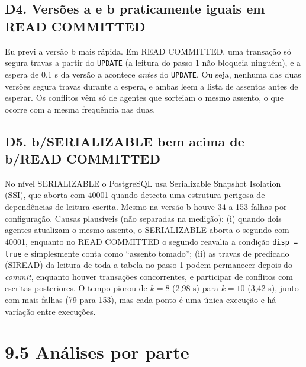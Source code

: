 \documentclass[11pt,a4paper]{article}
\newcommand{\tp}[1]{\texttt{#1}}
\begin{document}
\subsection*{D4. Versões a e b praticamente iguais em READ COMMITTED}
Eu previ a versão b mais rápida. Em READ COMMITTED, uma transação só segura travas a partir do \tp{UPDATE} (a leitura do passo 1 não bloqueia ninguém), e a espera de 0,1 s da versão a acontece \emph{antes} do \tp{UPDATE}. Ou seja, nenhuma das duas versões segura travas durante a espera, e ambas leem a lista de assentos antes de esperar. Os conflitos vêm só de agentes que sorteiam o mesmo assento, o que ocorre com a mesma frequência nas duas.

\subsection*{D5. b/SERIALIZABLE bem acima de b/READ COMMITTED}
No nível SERIALIZABLE o PostgreSQL usa Serializable Snapshot Isolation (SSI), que aborta com 40001 quando detecta uma estrutura perigosa de dependências de leitura-escrita. Mesmo na versão b houve 34 a 153 falhas por configuração. Causas plausíveis (não separadas na medição): (i) quando dois agentes atualizam o mesmo assento, o SERIALIZABLE aborta o segundo com 40001, enquanto no READ COMMITTED o segundo reavalia a condição \tp{disp = true} e simplesmente conta como ``assento tomado''; (ii) as travas de predicado (SIREAD) da leitura de toda a tabela no passo 1 podem permanecer depois do \emph{commit}, enquanto houver transações concorrentes, e participar de conflitos com escritas posteriores. O tempo piorou de $k=8$ (2,98 s) para $k=10$ (3,42 s), junto com mais falhas (79 para 153), mas cada ponto é uma única execução e há variação entre execuções.

\section*{9.5 Análises por parte}
\end{document}
